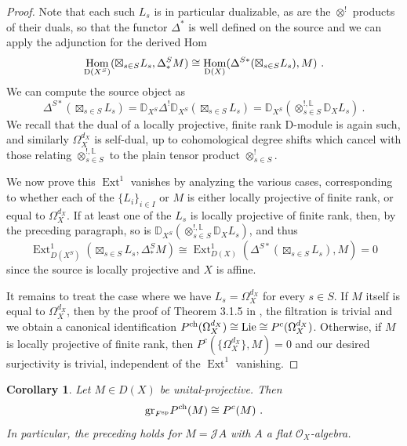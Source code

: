 \documentclass[11pt]{amsart}
\numberwithin{equation}{section}
\newtheorem{coro}[theo]{Corollary}
\theoremstyle{definition}
\newcommand{\bb}{\mathbb}
\newcommand{\mc}{\mathcal}
\newcommand{\spe}{{\textup{sp}}}
\newcommand{\DDD}{{{\bb D}}}
\DeclareMathOperator{\Hom}{Hom}
\DeclareMathOperator{\Ext}{Ext}
\newcommand{\Lie}{{\textup{Lie}}}
\newcommand{\ch}{{\textup{ch}}}
\newcommand{\0}{{\textbf{0}}}
\newcommand{\Dd}{{\textup{D}}}
\newcommand{\DD}{{D}}
\newcommand{\gr}{\textup{gr}}
\def\JJ{{\mc J}}
\def\ch{{\rm ch}}
\begin{document}
\begin{proof}
	Note that each such $L_s$ is in particular dualizable, as are the $\otimes^!$ products of their duals, so that the functor $\Delta^*$ is well defined on the source and we can apply the adjunction for the derived Hom
	\[ \Hom_{\Dd(X^S)}( \boxtimes_{s\in S} L_s , \Delta^S_*M) \cong \Hom_{\Dd(X)}( \Delta^{S*}( \boxtimes_{s\in S} L_s),M) \ .\]
	We can compute the source object as
	\[ \Delta^{S*}( \boxtimes_{s\in S} L_s) = \DDD_{X^S} \Delta^! \DDD_{X^S} ( \boxtimes_{s\in S} L_s) = \DDD_{X^S} ( \otimes^{!,\bb L}_{s\in S} \DDD_X L_s ) \ .\]
	We recall that the dual of a locally projective, finite rank D-module is again such, and similarly $\Omega_X^{d_X}$ is self-dual, up to cohomological degree shifts which cancel with those relating $\otimes^{!,\bb L}_{s\in S}$ to the plain tensor product $\otimes^!_{s\in S}$.
	
	We now prove this $\Ext^1$ vanishes by analyzing the various cases, corresponding to whether each of the $\{L_i\}_{i\in I}$ or $M$ is either locally projective of finite rank, or equal to $\Omega_X^{d_X}$. If at least one of the $L_s$ is locally projective of finite rank, then, by the preceding paragraph, so is $\DDD_{X^S} ( \otimes^{!,\bb L}_{s\in S} \DDD_X L_s )$, and thus
	\[ \Ext^1_{\DD(X^S)}( \boxtimes_{s\in S} L_s , \Delta^S_*M) \cong \Ext^1_{\DD(X)}( \Delta^{S*}( \boxtimes_{s\in S} L_s),M) = 0\]
	since the source is locally projective and $X$ is affine.
	
	It remains to treat the case where we have $L_s=\Omega_X^{d_X}$ for every $s\in S$. If $M$ itself is equal to $\Omega_X^{d_X}$, then by the proof of Theorem 3.1.5 in \cite{BD1}, the filtration is trivial and we obtain a canonical identification $P^\ch(\Omega_X^{d_X}) \cong \Lie \cong P^c(\Omega_X^{d_X})$. Otherwise, if $M$ is locally projective of finite rank, then $P^c(\{\Omega_X^{d_X}\},M)=0$ and our desired surjectivity is trivial, independent of the $\Ext^1$ vanishing.
	
\end{proof}


\begin{coro}
	Let $M\in \DD(X)$ be unital-projective. Then 
	\[
	\gr_{F^\spe} P^\ch(M) \cong P^c(M)~.
	\]
	In particular, the preceding holds for $M = \JJ A$ with $A$ a flat $\mc O_X$-algebra.
\end{coro}




\subsubsection{}
\end{document}
